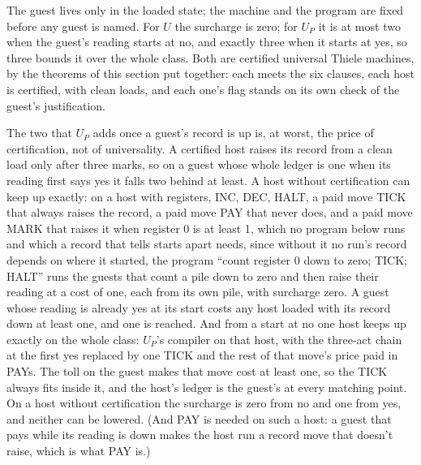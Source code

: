 \documentclass[11pt,twoside]{article}
\theoremstyle{thielethm}
\theoremstyle{thieledef}
\theoremstyle{thieledef}
\theoremstyle{thieledef}
\theoremstyle{thielethm}
\theoremstyle{thieleobs}
\theoremstyle{thielethm}
\begin{document}
The guest lives only in the loaded state; the machine and the program are fixed before any guest is
named. For $U$ the surcharge is zero; for $U_P$ it is at most two when the guest's reading starts
at no, and exactly three when it starts at yes, so three bounds it over the whole class. Both are
certified universal Thiele machines, by the theorems of this section put together: each meets the
six clauses, each host is certified, with clean loads, and each one's flag stands on
its own check of the guest's justification.

The two that $U_P$ adds once a guest's record is up is, at worst, the price of certification, not of universality. A certified host raises its record from a clean load only after three marks, so on a guest whose whole ledger is one when its reading first says yes it falls two behind at least. A host without
certification can keep up exactly: on a host with registers, INC, DEC, HALT, a paid move TICK that always raises the record, a paid move PAY that never does, and a paid move MARK that raises it when register 0 is at least 1, which no program below runs and which a record that tells starts apart needs, since without it no run's record depends on where it started, the program ``count register 0 down
to zero; TICK; HALT'' runs the guests that count a pile down to zero and then raise their reading
at a cost of one, each from its own pile, with surcharge zero. A guest whose reading is already yes at
its start costs any host loaded with its record down at least one, and one is reached. And from a start at no one host keeps up exactly on the whole class: $U_P$'s compiler on that host, with the three-act chain at the first yes replaced by one TICK and the rest of that move's price paid in PAYs. The toll on the guest makes that move cost at least one, so the TICK always fits inside it, and the host's ledger is the guest's at every matching point. On a host without certification the surcharge is zero from no and one from yes, and neither can be lowered. (And PAY is needed on such a host: a guest
that pays while its reading is down makes the host run a record move that doesn't raise, which is
what PAY is.)
\end{document}
